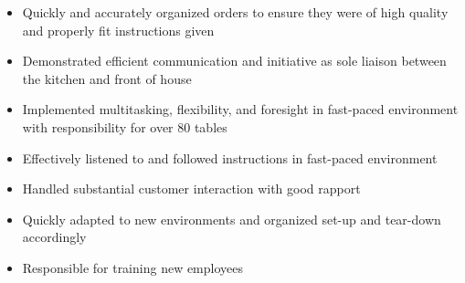 {}
\begin{itemize}
	\item Quickly and accurately organized orders to ensure they were of high quality and properly fit instructions given
	\item Demonstrated efficient communication and initiative as sole liaison between the kitchen and front of house
	\item Implemented multitasking, flexibility, and foresight in fast-paced environment with responsibility for over 80 tables
\end{itemize}

\vspace*{0.5em}
{}
\begin{itemize}
	\item Effectively listened to and followed instructions in fast-paced environment
	\item Handled substantial customer interaction with good rapport
	\item Quickly adapted to new environments and organized set-up and tear-down accordingly
	\item Responsible for training new employees
\end{itemize}